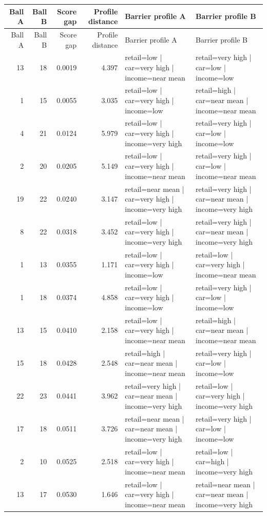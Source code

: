\documentclass[10pt,a4paper]{article}
\begin{document}
\begin{longtable}{rrrrp{4.25cm}p{4.25cm}}
\toprule
Ball A & Ball B & Score gap & Profile distance & Barrier profile A & Barrier profile B\\
\midrule
\endfirsthead
\toprule
Ball A & Ball B & Score gap & Profile distance & Barrier profile A & Barrier profile B\\
\midrule
\endhead
13 & 18 & 0.0019 & 4.397 & retail=low | car=very high | income=near mean & retail=very high | car=low | income=low \\
1 & 15 & 0.0055 & 3.035 & retail=low | car=very high | income=low & retail=high | car=near mean | income=near mean \\
4 & 21 & 0.0124 & 5.979 & retail=low | car=very high | income=very high & retail=very high | car=low | income=low \\
2 & 20 & 0.0205 & 5.149 & retail=low | car=very high | income=near mean & retail=very high | car=low | income=near mean \\
19 & 22 & 0.0240 & 3.147 & retail=near mean | car=very high | income=very high & retail=very high | car=near mean | income=very high \\
8 & 22 & 0.0318 & 3.452 & retail=low | car=very high | income=very high & retail=very high | car=near mean | income=very high \\
1 & 13 & 0.0355 & 1.171 & retail=low | car=very high | income=low & retail=low | car=very high | income=near mean \\
1 & 18 & 0.0374 & 4.858 & retail=low | car=very high | income=low & retail=very high | car=low | income=low \\
13 & 15 & 0.0410 & 2.158 & retail=low | car=very high | income=near mean & retail=high | car=near mean | income=near mean \\
15 & 18 & 0.0428 & 2.548 & retail=high | car=near mean | income=near mean & retail=very high | car=low | income=low \\
22 & 23 & 0.0441 & 3.962 & retail=very high | car=near mean | income=very high & retail=low | car=very high | income=very high \\
17 & 18 & 0.0511 & 3.726 & retail=near mean | car=near mean | income=very high & retail=very high | car=low | income=low \\
2 & 10 & 0.0525 & 2.518 & retail=low | car=very high | income=near mean & retail=low | car=high | income=very high \\
13 & 17 & 0.0530 & 1.646 & retail=low | car=very high | income=near mean & retail=near mean | car=near mean | income=very high \\

\end{longtable}
\end{document}
